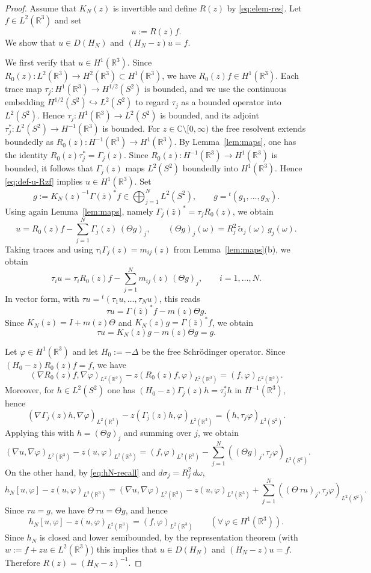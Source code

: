 \documentclass[a4paper,11pt]{article}
\numberwithin{equation}{section}
\def\re{\mathbb{R}}
\def\co{\mathbb{C}}
\theoremstyle{definition}
\theoremstyle{remark}
\begin{document}
\begin{proof}
Assume that $K_N(z)$ is invertible and define $R(z)$ by \eqref{eq:elem-res}.
Let $f\in L^2(\re^3)$ and set
\begin{equation}\label{eq:def-u-Rzf}
u:=R(z)f.
\end{equation}
We show that $u\in D(H_N)$ and $(H_N-z)u=f$.

We first verify that $u\in H^1(\re^3)$.
Since $R_0(z):L^2(\re^3)\to H^2(\re^3)\subset H^1(\re^3)$, we have
$R_0(z)f\in H^1(\re^3)$.
Each trace map $\tau_j:H^1(\mathbb R^3)\to H^{1/2}(S^2)$ is bounded, and we use the continuous embedding
$H^{1/2}(S^2)\hookrightarrow L^2(S^2)$ to regard $\tau_j$ as a bounded operator into $L^2(S^2)$.
Hence $\tau_j:H^1(\re^3)\to L^2(S^2)$ is bounded, and its adjoint
$\tau_j^\ast:L^2(S^2)\to H^{-1}(\re^3)$ is bounded.
For $z\in\co\setminus[0,\infty)$ the free resolvent extends boundedly as
$R_0(z):H^{-1}(\re^3)\to H^1(\re^3)$.
By Lemma~\ref{lem:maps}, one has the identity $R_0(z)\tau_j^\ast=\Gamma_j(z)$.
Since $R_0(z):H^{-1}(\mathbb R^3)\to H^1(\mathbb R^3)$ is bounded, it follows that
$\Gamma_j(z)$ maps $L^2(S^2)$ boundedly into $H^1(\mathbb R^3)$.
Hence \eqref{eq:def-u-Rzf} implies $u\in H^1(\mathbb R^3)$.
Set
\[
g:=K_N(z)^{-1}\Gamma(\bar z)^{\ast}f
\in \bigoplus_{j=1}^N L^2(S^2),
\qquad
g={}^{t}(g_1,\dots,g_N).
\]
Using again Lemma~\ref{lem:maps}, namely $\Gamma_j(\bar z)^{\ast}=\tau_j R_0(z)$, we obtain
\[
u
=
R_0(z)f-\sum_{j=1}^N \Gamma_j(z)\,(\Theta g)_j,
\qquad
(\Theta g)_j(\omega)=R_j^2\,\widetilde\alpha_j(\omega)\,g_j(\omega).
\]
%
Taking traces and using $\tau_i\Gamma_j(z)=m_{ij}(z)$ from Lemma~\ref{lem:maps}(b), we obtain
$$
\tau_i u
=
\tau_iR_0(z)f-\sum_{j=1}^N m_{ij}(z)\,(\Theta g)_j,
\qquad i=1,\dots,N.
$$
In vector form, with $\tau u={}^{t}(\tau_1u,\dots,\tau_Nu)$, this reads
$$
\tau u
=
\Gamma(\bar z)^{\ast}f-m(z)\Theta g.
$$
Since $K_N(z)=I+m(z)\Theta$ and $K_N(z)g=\Gamma(\bar z)^{\ast}f$, we obtain
$$
\tau u
=
K_N(z)g-m(z)\Theta g
=
g.
$$

Let $\varphi\in H^1(\re^3)$ and let $H_0:=-\Delta$ be the free Schr\"odinger operator. 
Since $(H_0-z)R_0(z)f=f$, we have
$$
(\nabla R_0(z)f,\nabla\varphi)_{L^2(\re^3)}
-
z(R_0(z)f,\varphi)_{L^2(\re^3)}
=
(f,\varphi)_{L^2(\re^3)}.
$$
Moreover, for $h\in L^2(S^2)$ one has $(H_0-z)\Gamma_j(z)h=\tau_j^\ast h$ in
$H^{-1}(\re^3)$, hence
$$
(\nabla \Gamma_j(z)h,\nabla\varphi)_{L^2(\re^3)}
-
z(\Gamma_j(z)h,\varphi)_{L^2(\re^3)}
=
(h,\tau_j\varphi)_{L^2(S^2)} .
$$
Applying this with $h=(\Theta g)_j$ and summing over $j$, we obtain
$$
(\nabla u,\nabla\varphi)_{L^2(\re^3)}
-
z(u,\varphi)_{L^2(\re^3)}
=
(f,\varphi)_{L^2(\re^3)}
-
\sum_{j=1}^N ((\Theta g)_j,\tau_j\varphi)_{L^2(S^2)}.
$$
On the other hand, by \eqref{eq:hN-recall} and $d\sigma_j=R_j^2\,d\omega$,
$$
h_N[u,\varphi]-z(u,\varphi)_{L^2(\re^3)}
=
(\nabla u,\nabla\varphi)_{L^2(\re^3)}
-
z(u,\varphi)_{L^2(\re^3)}
+
\sum_{j=1}^N ((\Theta\,\tau u)_j,\tau_j\varphi)_{L^2(S^2)}.
$$
Since $\tau u=g$, we have $\Theta\,\tau u=\Theta g$, and hence
$$
h_N[u,\varphi]-z(u,\varphi)_{L^2(\re^3)}
=
(f,\varphi)_{L^2(\re^3)}
\qquad(\forall\,\varphi\in H^1(\re^3)).
$$
Since $h_N$ is closed and lower semibounded, by the representation theorem
(with $w:=f+zu\in L^2(\re^3)$) this implies that
$u\in D(H_N)$ and $(H_N-z)u=f$.
Therefore $R(z)=(H_N-z)^{-1}$.


\end{proof}
\end{document}
